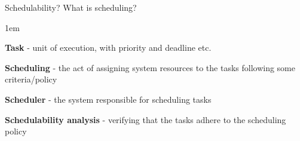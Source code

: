 \begin{frame}{Schedulability?}
    What is scheduling?
    \vspace{1em}
    \begin{itemize-size}{1em}
        \item \textbf{Task} - unit of execution, with priority and deadline etc.
        \item \textbf{Scheduling} - the act of assigning system
        resources to the tasks following some criteria/policy
    \item \textbf{Scheduler} - the system responsible for
        scheduling tasks
    \item \textbf{Schedulability analysis} - verifying that the tasks
        adhere to the scheduling policy
    \end{itemize-size}
\end{frame}

